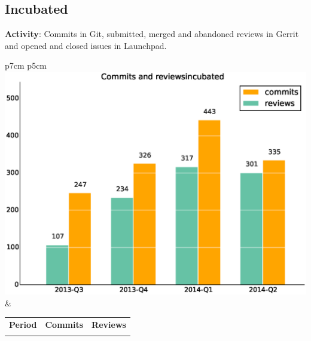 \documentclass[a4wide,11pt]{report}
\begin{document}
\newpage
\subsection{Incubated}

\textbf{Activity}: Commits in Git, submitted, merged and abandoned reviews in Gerrit and opened and closed issues in Launchpad.

\begin{tabular}{p{7cm} p{5cm}}
    \vspace{0pt} 
    \includegraphics[scale=.35]{figs/commitsincubated.eps}
    & 
    \vspace{0pt}
    \begin{tabular}{l|r|r|}%
    \bfseries Period & \bfseries Commits & \bfseries Reviews %
    \csvreader[head to column names]{data/commitsincubated.csv}{}%
    {\\ & \commits & \submitted}
    \end{tabular}
\end{tabular}
\end{document}
